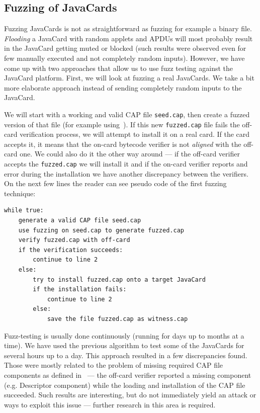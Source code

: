 \documentclass{../llncs/llncs}
\begin{document}
    \subsection{Fuzzing of JavaCards}
    Fuzzing JavaCards is not as straightforward as fuzzing for example a binary file. \textit{Flooding} a JavaCard with random applets and APDUs will most probably result in the JavaCard getting muted or blocked (such results were observed even for few manually executed and not completely random inputs). However, we have come up with two approaches that allow us to use fuzz testing against the JavaCard platform. First, we will look at fuzzing a real JavaCards. We take a bit more elaborate approach instead of sending completely random inputs to the JavaCard.

    We will start with a working and valid CAP file \texttt{seed.cap}, then create a fuzzed version of that file (for example using~\cite{radamsa}). If this new \texttt{fuzzed.cap} file fails the off-card verification process, we will attempt to install it on a real card. If the card accepts it, it means that the on-card bytecode verifier is not \textit{aligned} with the off-card one. We could also do it the other way around --- if the off-card verifier accepts the \texttt{fuzzed.cap} we will install it and if the on-card verifier reports and error during the installation we have another discrepancy between the verifiers. On the next few lines the reader can see pseudo code of the first fuzzing technique:

\begin{verbatim}
while true:
    generate a valid CAP file seed.cap
    use fuzzing on seed.cap to generate fuzzed.cap
    verify fuzzed.cap with off-card
    if the verification succeeds:
        continue to line 2
    else:
        try to install fuzzed.cap onto a target JavaCard
        if the installation fails:
            continue to line 2
        else: 
            save the file fuzzed.cap as witness.cap
\end{verbatim}

Fuzz-testing is usually done continuously (running for days up to months at a time). We have used the previous algorithm to test some of the JavaCards for several hours up to a day. This approach resulted in a few discrepancies found. Those were mostly related to the problem of missing required CAP file components as defined in~\cite{jcspecs31download} --- the off-card verifier reported a missing component (e.g. Descriptor component) while the loading and installation of the CAP file succeeded. Such results are interesting, but do not immediately yield an attack or ways to exploit this issue --- further research in this area is required.
\end{document}
